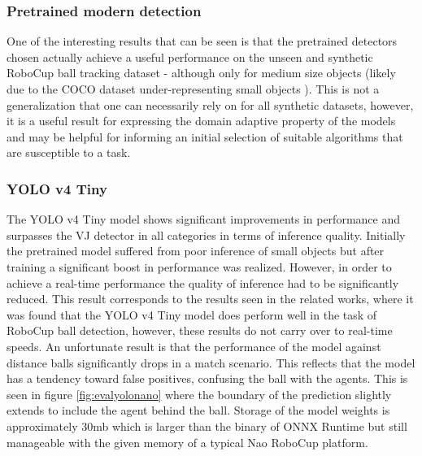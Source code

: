 \documentclass[a4paper,twoside,12pt]{report}
\begin{document}
\subsubsection{Pretrained modern detection}

One of the interesting results that can be seen is that the pretrained detectors chosen actually achieve a useful performance on the unseen and synthetic RoboCup ball tracking dataset - although only for medium size objects (likely due to the COCO dataset under-representing small objects \citep{smallcoco}). This is not a generalization that one can necessarily rely on for all synthetic datasets, however, it is a useful result for expressing the domain adaptive property of the models and may be helpful for informing an initial selection of suitable algorithms that are susceptible to a task.

\subsubsection{YOLO v4 Tiny}

The YOLO v4 Tiny model shows significant improvements in performance and surpasses the VJ detector in all categories in terms of inference quality. Initially the pretrained model suffered from poor inference of small objects but after training a significant boost in performance was realized. However, in order to achieve a real-time performance the quality of inference had to be significantly reduced. This result corresponds to the results seen in the related works, where it was found that the YOLO v4 Tiny model does perform well in the task of RoboCup ball detection, however, these results do not carry over to real-time speeds. An unfortunate result is that the performance of the model against distance balls significantly drops in a match scenario. This reflects that the model has a tendency toward false positives, confusing the ball with the agents. This is seen in figure \ref{fig:evalyolonano} where the boundary of the prediction slightly extends to include the agent behind the ball. Storage of the model weights is approximately 30mb which is larger than the binary of ONNX Runtime but still manageable with the given memory of a typical Nao RoboCup platform.
\end{document}

